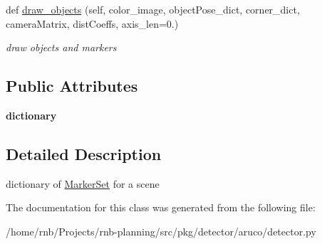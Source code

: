 \begin{DoxyCompactItemize}
\mbox{\label{classrnb-planning_1_1src_1_1pkg_1_1detector_1_1aruco_1_1detector_1_1_aruco_map_a4c70570db6c09870de35e334b4eb53eb}} 
def \hyperlink{classrnb-planning_1_1src_1_1pkg_1_1detector_1_1aruco_1_1detector_1_1_aruco_map_a4c70570db6c09870de35e334b4eb53eb}{draw\+\_\+objects} (self, color\+\_\+image, object\+Pose\+\_\+dict, corner\+\_\+dict, camera\+Matrix, dist\+Coeffs, axis\+\_\+len=0.)
\begin{DoxyCompactList}\small\item\em draw objects and markers \end{DoxyCompactList}\end{DoxyCompactItemize}
\subsection*{Public Attributes}
\begin{DoxyCompactItemize}
\item 
\mbox{\label{classrnb-planning_1_1src_1_1pkg_1_1detector_1_1aruco_1_1detector_1_1_aruco_map_a25a0473e63533b8345cf7b6c8e3d488b}} 
{\bfseries dictionary}
\end{DoxyCompactItemize}


\subsection{Detailed Description}
dictionary of \hyperlink{classrnb-planning_1_1src_1_1pkg_1_1detector_1_1aruco_1_1detector_1_1_marker_set}{Marker\+Set} for a scene 

The documentation for this class was generated from the following file\+:\begin{DoxyCompactItemize}
\item 
/home/rnb/\+Projects/rnb-\/planning/src/pkg/detector/aruco/detector.\+py\end{DoxyCompactItemize}
